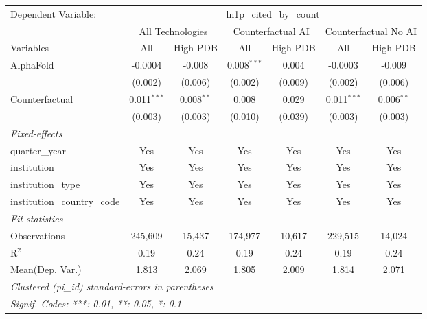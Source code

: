 \begingroup
\centering
\begin{tabular}{lcccccc}
   \tabularnewline \midrule \midrule
   Dependent Variable: & \multicolumn{6}{c}{ln1p\_cited\_by\_count}\\
 & \multicolumn{2}{c}{All Technologies} & \multicolumn{2}{c}{Counterfactual AI} & \multicolumn{2}{c}{Counterfactual No AI} \\
\cmidrule(lr){1-1}\cmidrule(lr){2-3} \cmidrule(lr){4-5} \cmidrule(lr){6-7}
Variables & \multicolumn{1}{c}{All} & \multicolumn{1}{c}{High PDB} & \multicolumn{1}{c}{All} & \multicolumn{1}{c}{High PDB} & \multicolumn{1}{c}{All} & \multicolumn{1}{c}{High PDB} \\
\cmidrule(lr){1-1}\cmidrule(lr){2-2} \cmidrule(lr){3-3} \cmidrule(lr){4-4} \cmidrule(lr){5-5} \cmidrule(lr){6-6} \cmidrule(lr){7-7}
   AlphaFold                    & -0.0004       & -0.008       & 0.008$^{***}$ & 0.004   & -0.0003       & -0.009\\   
                                & (0.002)       & (0.006)      & (0.002)       & (0.009) & (0.002)       & (0.006)\\   
   Counterfactual               & 0.011$^{***}$ & 0.008$^{**}$ & 0.008         & 0.029   & 0.011$^{***}$ & 0.006$^{**}$\\   
                                & (0.003)       & (0.003)      & (0.010)       & (0.039) & (0.003)       & (0.003)\\   
   \midrule
   \emph{Fixed-effects}\\
   quarter\_year                & Yes           & Yes          & Yes           & Yes     & Yes           & Yes\\  
   institution                  & Yes           & Yes          & Yes           & Yes     & Yes           & Yes\\  
   institution\_type            & Yes           & Yes          & Yes           & Yes     & Yes           & Yes\\  
   institution\_country\_code   & Yes           & Yes          & Yes           & Yes     & Yes           & Yes\\  
   \midrule
   \emph{Fit statistics}\\
   Observations                 & 245,609       & 15,437       & 174,977       & 10,617  & 229,515       & 14,024\\  
   R$^2$                        & 0.19          & 0.24         & 0.19          & 0.24    & 0.19          & 0.24\\  
Mean(Dep. Var.) & 1.813 & 2.069 & 1.805 & 2.009 & 1.814 & 2.071 \\
   \midrule \midrule
   \multicolumn{7}{l}{\emph{Clustered (pi\_id) standard-errors in parentheses}}\\
   \multicolumn{7}{l}{\emph{Signif. Codes: ***: 0.01, **: 0.05, *: 0.1}}\\
\end{tabular}
\par\endgroup
